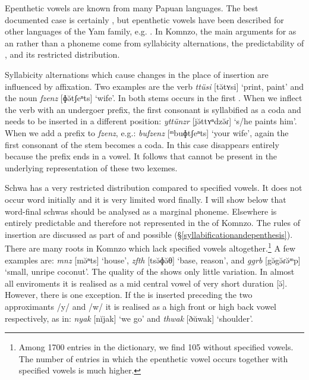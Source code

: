 Epenthetic vowels are known from many Papuan languages. The best documented case is certainly  \citep{Biggs:1963wk, Pawley:1966wj, Blevins:2010ee}, but epenthetic vowels have been described for other languages of the Yam family, e.g.  \citep{Evans:ji}. In Komnzo, the main arguments for  as an  rather than a phoneme come from syllabicity alternations, the predictability of , and its restricted distribution.%

Syllabicity alternations which cause changes in the place of  insertion are influenced by affixation. Two examples are the verb \emph{ttüsi} [tə̆tʏsi] `print, paint' and the noun \emph{fzenz} [ɸə̆tʃeⁿts] `wife'. In both stems  occurs in the first . When we inflect the verb with an undergoer prefix, the first consonant is syllabified as a coda and  needs to be inserted in a different position: \emph{yttünzr} [jə̆ttʏⁿdzə̆ɾ] `s/he paints him'. When we add a  prefix to \emph{fzenz}, e.g.: \emph{bufzenz} [ᵐbuɸtʃeⁿts] `your wife', again the first consonant of the stem becomes a coda. In this case  disappears entirely because the  prefix ends in a vowel. It follows that  cannot be present in the underlying representation of these two lexemes.%

Schwa has a very restricted distribution compared to specified vowels. It does not occur word initially and it is very limited word finally. I will show below that word-final schwas should be analysed as a marginal phoneme. Elsewhere  is entirely predictable and therefore not represented in the  of Komnzo. The rules of  insertion are discussed as part of  and possible  (\S{}\ref{syllabificationandepenthesis}). There are many roots in Komnzo which lack specified vowels altogether.\footnote{Among 1700 entries in the dictionary, we find 105 without specified vowels. The number of entries in which the epenthetic vowel occurs together with specified vowels is much higher.} A few examples are: \emph{mnz} [mə̆ⁿts] `house', \emph{zfth} [tsə̆ɸə̆θ] `base, reason', and \emph{ggrb} [{\ᵑ}gə̆{\ᵑ}gə̆ɾə̆ᵐp] `small, unripe coconut'. The quality of the  shows only little variation. In almost all enviroments it is realised as a mid central vowel of very short duration [ə̆]. However, there is one exception. If the  is inserted preceding the two approximants /y/ and /w/ it is realised as a high front or high back vowel respectively, as in: \emph{nyak} [nĭjak] `we go' and \emph{thwak} [ðŭwak] `shoulder'.%

